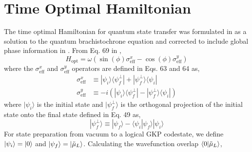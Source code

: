 \documentclass[11pt]{article}
\begin{document}
\section{Time Optimal Hamiltonian}
The time optimal Hamiltonian for quantum state transfer was formulated in \cite{carlini2006TimeOptimal} as a solution to the quantum brachistochrone equation and corrected to include global phase information in \cite{yang2022MinimumTime}. From Eq. 69 in \cite{yang2022MinimumTime},
\begin{equation}
    H_{\mathrm{opt}} = \omega (\sin(\phi) \sigma_{\mathrm{eff}}^{x} - \cos(\phi) \sigma_{\mathrm{eff}}^{y})
\end{equation}
where the $\sigma_{\mathrm{eff}}^{x}$ and $\sigma_{\mathrm{eff}}^{y}$ operators are defined in Eqs. 63 and 64 as,
\begin{align}
    \sigma_{\mathrm{eff}}^{x} & \equiv |\psi_i\rangle \langle \psi_f^{\perp}| + |\psi_f^{\perp}\rangle \langle \psi_{i}|     \\
    \sigma_{\mathrm{eff}}^{y} & \equiv -i(|\psi_i\rangle \langle \psi_f^{\perp}| - |\psi_f^{\perp}\rangle \langle \psi_{i}|)
\end{align}
where $|\psi_i\rangle$ is the initial state and $|\psi_f^{\perp}\rangle$ is the orthogonal projection of the initial state onto the final state defined in Eq. 49 as,
\begin{equation}
    |\psi_f^{\perp}\rangle \equiv |\psi_f\rangle - \langle \psi_i |\psi_f\rangle |\psi_i\rangle
\end{equation}
For state preparation from vacuum to a logical GKP codestate, we define $\ket{\psi_i} = \ket{0}$ and $\ket{\psi_f} = \ket{\tilde{\mu}_L}$. Calculating the wavefunction overlap $\braket{0}{\tilde{\mu}_L}$,
\end{document}
